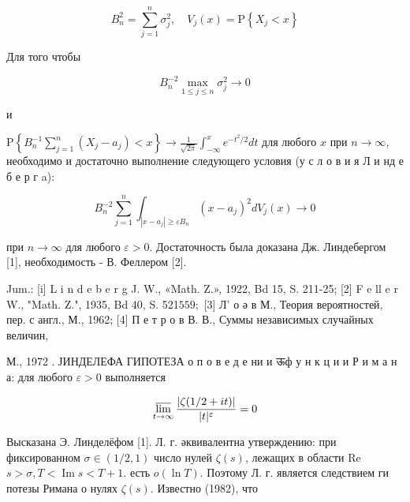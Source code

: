 \documentclass[10pt]{article}
\begin{document}
\[

B_{n}^{2}=\sum_{j=1}^{n} \sigma_{j}^{2}, \quad V_{j}(x)=\mathrm{P}\left\{X_{j}<x\right\}

\]



Для того чтобы



\[

B_{n}^{-2} \max _{1 \leqslant j \leqslant n} \sigma_{j}^{2} \rightarrow 0

\]



и



$\mathrm{P}\left\{B_{n}^{-1} \sum_{j=1}^{n}\left(X_{j}-a_{j}\right)<x\right\} \rightarrow \frac{1}{\sqrt{2 \pi}} \int_{-\infty}^{x} e^{-t^{2} / 2} d t$ для любого $x$ при $n \rightarrow \infty$, необходимо и достаточно выполнение следующего условия (у с л о в и я Л и нд е б е р г a):



\[

B_{n}^{-2} \sum_{j=1}^{n} \int_{\left|x-a_{j}\right| \geqslant \varepsilon B_{n}}\left(x-a_{j}\right)^{2} d V_{j}(x) \longrightarrow 0

\]



при $n \rightarrow \infty$ для любого $\varepsilon>0$. Достаточность была доказана Дж. Линдебергом [1], необходимость - В. Феллером [2].



Jum.: [i] L i n d e b e r g J. W., «Math. Z.», 1922, Bd 15, S. 211-25; [2] F e ll e r W., "Math. Z.", 1935, Bd 40, S. 521$559 ;$ [3] Л' о ә в М., Теория вероятностей, пер. с англ., М., 1962; [4] П е т р о в В. В., Суммы независимых случайных величин,

М., 1972 . ЈИНДЕЛЕФА ГИПОТЕЗА о п о в е д е ни и ऊф у н к ц и и Р и м а н а: для любого $\varepsilon>0$ выполняется



\[

\varlimsup_{t \rightarrow \infty} \frac{|\zeta(1 / 2+i t)|}{|t|^{\varepsilon}}=0

\]



Высказана Э. Линделёфом [1]. Л. г. әквивалентна утверждению: при фиксированном $\sigma \in(1 / 2,1)$ число нулей $\zeta(s)$, лежащих в области Re $s>\sigma, T<\operatorname{Im} s<T+1$. есть $o(\ln T)$. Поэтому Л. г. является следствием ги потезы Римана о нулях $\zeta(s)$. Известно (1982), что
\end{document}
